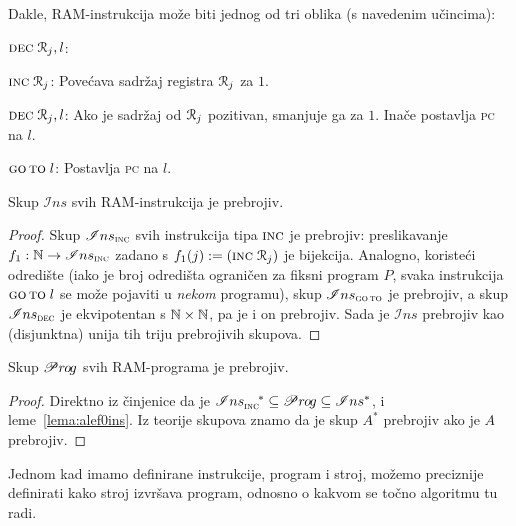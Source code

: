 Dakle, RAM-instrukcija može biti jednog od tri oblika (s navedenim učincima):
\begin{labeling}{$\textsc{dec}\;\mathcal R_{j},l$:}
    \item[$\textsc{inc}\;\mathcal R_{j}$:] Povećava sadržaj registra $\mathcal R_{j}$ za $1$.
    \item[$\textsc{dec}\;\mathcal R_{j},l$:] Ako je sadržaj od $\mathcal R_{j}$ pozitivan, smanjuje ga za $1$. Inače postavlja \textsc{pc} na $l$.
    \item[$\textsc{go\,to}\;l$:] Postavlja \textsc{pc} na $l$.
\end{labeling}

\begin{lema}[{name=[prebrojivost skupa $\mathscr Ins$]}]\label{lema:alef0ins}
Skup $\mathscr Ins$ svih RAM-instrukcija je prebrojiv.
\end{lema}
\begin{proof}
Skup $\mathscr Ins_{\textsc{inc}}$ svih instrukcija tipa $\textsc{inc}$ je prebrojiv: preslikavanje $f_1:{\mathbb N}\to\mathscr Ins_{\textsc{inc}}$ zadano s $f_1(j):=(\textsc{inc}\;\mathcal R_{j})$ je bijekcija. Analogno, koristeći odredište (iako je broj odredišta ograničen za fiksni program $P$, svaka instrukcija $\textsc{go\,to}\;l$ se može pojaviti u \emph{nekom} programu), skup $\mathscr Ins_{\textsc{go\,to}}$ je prebrojiv, a skup $\mathscr Ins_{\textsc{dec}}$ je ek\-vi\-po\-ten\-tan s ${\mathbb N}\times{\mathbb N}$, pa je i on prebrojiv. Sada je $\mathscr Ins$ prebrojiv kao (disjunktna) unija tih triju prebrojivih skupova.
\end{proof}

\begin{korolar}[{name=[prebrojivost skupa $\mathscr Pr\mspace{-1mu}o\mspace{-2mu}g$]}]\label{kor:alef0prog}
	Skup $\mathscr Pr\mspace{-1mu}o\mspace{-2mu}g$ svih RAM-programa je prebrojiv.
\end{korolar}
\begin{proof}
	Direktno iz činjenice da je $\mathscr Ins_{\textsc{inc}}^{\quad*}\subseteq\mathscr Pr\mspace{-1mu}o\mspace{-2mu}g\subseteq\mathscr Ins^*$, i leme~\ref{lema:alef0ins}. Iz teorije skupova znamo da je skup $A^*$ prebrojiv ako je $A$ prebrojiv.
\end{proof}


Jednom kad imamo definirane instrukcije, program i stroj, možemo preciznije definirati kako stroj izvršava program, odnosno o kakvom se točno algoritmu tu radi.

